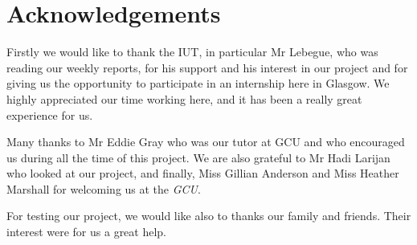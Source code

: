 \chapter{Acknowledgements}

{\large

Firstly we would like to thank the IUT, in particular Mr Lebegue, who was reading our weekly reports, for his support and his interest in our project and for giving us the opportunity to participate in an internship here in Glasgow. We highly appreciated our time working here, and it has been a really great experience for us.\newline 

Many thanks to Mr Eddie Gray who was our tutor at GCU and who encouraged us during all the time of this project. We are also grateful to Mr Hadi Larijan who looked at our project, and finally, Miss Gillian Anderson and Miss Heather Marshall for welcoming us at the \textit{GCU}.
\newline

For testing our project, we would like also to thanks our family and friends. Their interest were for us a great help.
\newline

}


\newpage